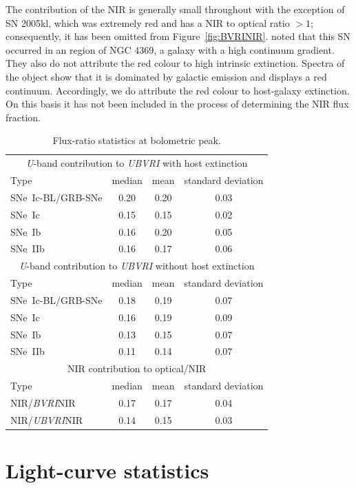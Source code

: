 \documentclass[a4paper,fleqn,usenatbib]{mnras}
\begin{document}
The contribution of the NIR is generally small throughout with the exception of SN 2005kl, which was extremely red and has a NIR to optical ratio $> 1$; consequently, it has been omitted from Figure~\ref{fig:BVRINIR}. \cite{Bianco2014} noted that this SN occurred in an  region of NGC 4369, a galaxy with a high continuum gradient. They also do not attribute the red colour to high intrinsic extinction. Spectra of the object show that it is dominated by galactic emission and displays a red continuum. Accordingly, we do attribute the red colour to host-galaxy extinction. On this basis it has not been included in the process of determining the NIR flux fraction.

\begin{table}
	\centering
	\caption{Flux-ratio statistics at bolometric peak.}
	\begin{tabular}{lccc}
	\hline
	\multicolumn{4}{c}{\textit{U}-band contribution to \textit{UBVRI} with host extinction}\\
	Type & median & mean & standard deviation \\
	\hline
	SNe~Ic-BL/GRB-SNe & 0.20 & 0.20 & 0.03 \\
	SNe~Ic & 0.15 & 0.15 & 0.02 \\
    SNe~Ib & 0.16 & 0.20 & 0.05 \\
    SNe~IIb & 0.16 & 0.17 & 0.06 \\
    \hline
	\multicolumn{4}{c}{\textit{U}-band contribution to \textit{UBVRI} without host extinction}\\
	Type & median & mean & standard deviation \\
	\hline
	SNe~Ic-BL/GRB-SNe & 0.18 & 0.19 & 0.07 \\
	SNe~Ic & 0.16 & 0.19 & 0.09 \\
    SNe~Ib & 0.13 & 0.15 & 0.07 \\
    SNe~IIb & 0.11 & 0.14 & 0.07 \\
    \hline
	\multicolumn{4}{c}{NIR contribution to optical/NIR}\\
	Type & median & mean & standard deviation \\
	\hline
	NIR/\textit{BVRI}NIR & 0.17 & 0.17 & 0.04 \\
	NIR/\textit{UBVRI}NIR & 0.14 & 0.15 & 0.03 \\
    \hline
	\end{tabular}
	\label{UNIR}
\end{table}

\section{Light-curve statistics}
\end{document}
